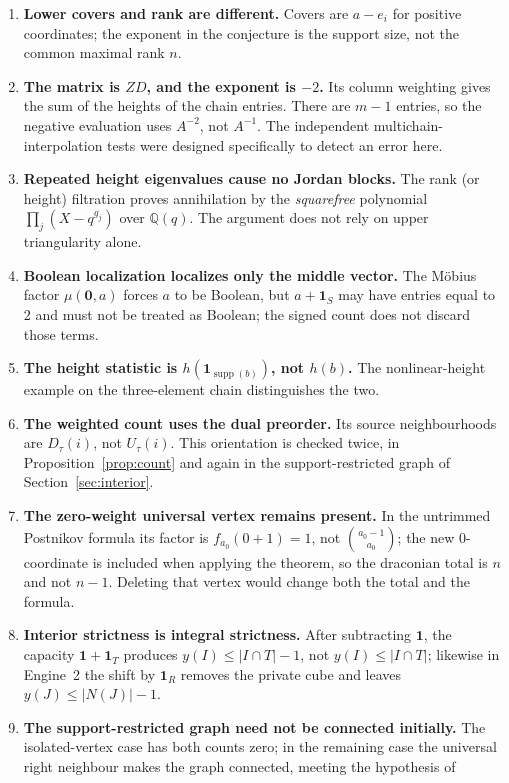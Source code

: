 \documentclass[11pt]{article}
\numberwithin{equation}{section}
\theoremstyle{definition}
\theoremstyle{remark}
\newcommand{\Q}{\mathbb Q}
\newcommand{\one}{\mathbf 1}
\newcommand{\zero}{\mathbf 0}
\newcommand{\supp}{\operatorname{supp}}
\begin{document}
\begin{enumerate}[label=\arabic*.]
\item \textbf{Lower covers and rank are different.} Covers are $a-e_i$ for
positive coordinates; the exponent in the conjecture is the support size, not
the common maximal rank $n$.
\item \textbf{The matrix is $ZD$, and the exponent is $-2$.} Its column
weighting gives the sum of the heights of the chain entries. There are $m-1$
entries, so the negative evaluation uses $A^{-2}$, not $A^{-1}$. The
independent multichain-interpolation tests were designed specifically to
detect an error here.
\item \textbf{Repeated height eigenvalues cause no Jordan blocks.} The rank
(or height) filtration proves annihilation by the \emph{squarefree}
polynomial $\prod_j(X-q^{g_j})$ over $\Q(q)$. The argument does not rely on
upper triangularity alone.
\item \textbf{Boolean localization localizes only the middle vector.} The
M\"obius factor $\mu(\zero,a)$ forces $a$ to be Boolean, but $a+\one_S$ may
have entries equal to $2$ and must not be treated as Boolean; the signed count
does not discard those terms.
\item \textbf{The height statistic is $h(\one_{\supp(b)})$, not $h(b)$.} The
nonlinear-height example on the three-element chain distinguishes the two.
\item \textbf{The weighted count uses the dual preorder.} Its source
neighbourhoods are $D_\tau(i)$, not $U_\tau(i)$. This orientation is checked
twice, in Proposition~\ref{prop:count} and again in the support-restricted
graph of Section~\ref{sec:interior}.
\item \textbf{The zero-weight universal vertex remains present.} In the
untrimmed Postnikov formula its factor is $f_{a_0}(0+1)=1$, not
$\binom{a_0-1}{a_0}$; the new $0$-coordinate is included when applying the
theorem, so the draconian total is $n$ and not $n-1$. Deleting that vertex
would change both the total and the formula.
\item \textbf{Interior strictness is integral strictness.} After subtracting
$\one$, the capacity $\one+\one_T$ produces $y(I)\le|I\cap T|-1$, not
$y(I)\le|I\cap T|$; likewise in Engine~2 the shift by $\one_R$ removes the
private cube and leaves $y(J)\le|N(J)|-1$.
\item \textbf{The support-restricted graph need not be connected initially.}
The isolated-vertex case has both counts zero; in the remaining case the
universal right neighbour makes the graph connected, meeting the hypothesis of

\end{enumerate}
\end{document}
